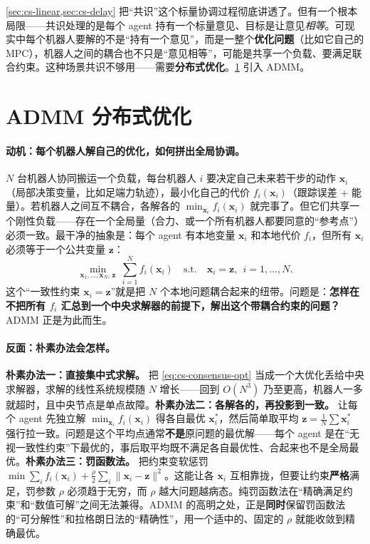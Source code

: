 \noindent \cref{sec:cs-linear,sec:cs-delay} 把“共识”这个标量协调过程彻底讲透了。但有一个根本局限——共识处理的是每个 agent 持有一个标量意见、目标是让意见\emph{相等}。可现实中每个机器人要解的不是“持有一个意见”，而是一整个\textbf{优化问题}（比如它自己的 MPC），机器人之间的耦合也不只是“意见相等”，可能是共享一个负载、要满足联合约束。这种场景共识不够用——需要\textbf{分布式优化}。\cref{sec:cs-admm} 引入 ADMM。

\section{ADMM 分布式优化}
\label{sec:cs-admm}

\paragraph{动机：每个机器人解自己的优化，如何拼出全局协调。}
$N$ 台机器人协同搬运一个负载，每台机器人 $i$ 要决定自己未来若干步的动作 $\mathbf{x}_i$（局部决策变量，比如足端力轨迹），最小化自己的代价 $f_i(\mathbf{x}_i)$（跟踪误差 + 能量）。若机器人之间互不耦合，各解各的 $\min_{\mathbf{x}_i}f_i(\mathbf{x}_i)$ 就完事了。但它们共享一个刚性负载——存在一个全局量（合力、或一个所有机器人都要同意的“参考点”）必须一致。最干净的抽象是：每个 agent 有本地变量 $\mathbf{x}_i$ 和本地代价 $f_i$，但所有 $\mathbf{x}_i$ 必须等于一个公共变量 $\mathbf{z}$：
\begin{equation}
  \min_{\mathbf{x}_1,\dots,\mathbf{x}_N,\,\mathbf{z}}\ \sum_{i=1}^N f_i(\mathbf{x}_i)\quad\text{s.t.}\quad \mathbf{x}_i=\mathbf{z},\ \ i=1,\dots,N.
  \label{eq:cs-consensus-opt}
\end{equation}
这个“一致性约束 $\mathbf{x}_i=\mathbf{z}$”就是把 $N$ 个本地问题耦合起来的纽带。问题是：\textbf{怎样在不把所有 $f_i$ 汇总到一个中央求解器的前提下，解出这个带耦合约束的问题？} ADMM 正是为此而生。

\paragraph{反面：朴素办法会怎样。}
\textbf{朴素办法一：直接集中式求解。} 把 \cref{eq:cs-consensus-opt} 当成一个大优化丢给中央求解器，求解的线性系统规模随 $N$ 增长——回到 $O(N^3)$ 乃至更高，机器人一多就超时，且中央节点是单点故障。\textbf{朴素办法二：各解各的，再投影到一致。} 让每个 agent 先独立解 $\min_{\mathbf{x}_i}f_i(\mathbf{x}_i)$ 得各自最优 $\mathbf{x}_i^*$，然后简单取平均 $\mathbf{z}=\tfrac1N\sum\mathbf{x}_i^*$ 强行拉一致。问题是这个平均点通常\textbf{不是}原问题的最优解——每个 agent 是在“无视一致性约束”下最优的，事后取平均既不满足各自最优性、合起来也不是全局最优。\textbf{朴素办法三：罚函数法。} 把约束变软惩罚 $\min\sum_i f_i(\mathbf{x}_i)+\tfrac\rho2\sum_i\|\mathbf{x}_i-\mathbf{z}\|^2$。这能让各 $\mathbf{x}_i$ 互相靠拢，但要让约束\textbf{严格}满足，罚参数 $\rho$ 必须趋于无穷，而 $\rho$ 越大问题越病态。纯罚函数法在“精确满足约束”和“数值可解”之间无法兼得。ADMM 的高明之处，正是\textbf{同时}保留罚函数法的“可分解性”和拉格朗日法的“精确性”，用一个适中的、固定的 $\rho$ 就能收敛到精确最优。

